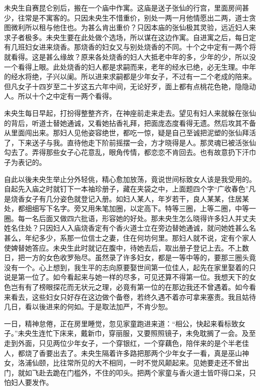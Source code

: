 \documentclass[a4paper,12pt,UTF8,twoside]{ctexbook}
\begin{document}
未央生自赛昆仑别后，搬在一个庙中作寓。这庙是送子张仙的行宫，里面房间甚少，往常是不寓客的。只因未央生不惜重价，别处一两一月他情愿出二两，道士贪图微利所以租与他住也。为甚么肯出重价？只因本庙的张仙极其灵验，远近妇人来求子者极多。未央生要在此处做个选场，所以谋在这边作寓。自进寓之后，每日定有几班妇女进来烧香。那烧香的妇女又与别处烧香的不同。十个之中定有一两个将就看得。这是甚么缘故？原来各处烧香的妇人大抵老中年的多，少年的少，所以没一个看得上眼。此处烧香的妇人都是求嗣而来，老年的经水已绝，必无生理。中年的经水将绝，子兴以阑。所以进来求嗣都是少年女子，不过有一二个老成的陪来。但凡女子十四岁至二十岁这五六年中间，无论好歹，面上都有点桃花色艳，隐隐动人。所以十个之中定有一两个看得。

未央生每日早起，打扮得整整齐齐，在神座前走来走去。望见有妇人来就躲在张仙的背后，听道士替她通诚，又看她拈香礼拜，把面庞态度看得无遗。然后攻其不备从里面闯出来。那妇人见他姿容绝世，都吃一惊，疑是自己至诚把泥塑的张仙拜活了，下来送子与我。直待他走下阶前摇摆一会，方才晓得是人。那灵魂已被活张仙勾去了。弄得那些女子心花意乱，眼角传情，都恋恋不肯回去。也有故意扔下汗巾子为表记的。

自此以後未央生举止分外轻佻，精心愈加放荡，竟说世间标致女人该是我受用的。自起先入庙之时就钉下一本袖珍册子，藏在夹袋之中，上面题四个字“广收春色”凡是烧香女子有几分姿色就登记入册。如妇人某人，年岁若干，良人某某，住居某处，都细细写下名字。旁又用朱笔加圈，以定高下。特等三圈，上等二圈，中等一圈。每一名后面又做四六批语，形容她的好处。那未央生怎么晓得许多妇人并丈夫姓名住处？只因妇人入庙烧香定有个香火道士立在旁边替她通诚，就问她姓甚么名甚么，年纪多少，系那一位信士之妻，住在何坊何里。那妇人就不说，定有个家人使婢替她答应。未央生此时就记在腹中，待她去后，取出册子登记上去。不上数日，把一方的女色收罗殆尽。虽然录了许多妇女，都是一等中等的，要那三圈头竟没有一个。心上想到，我生平的志向原要娶世间第一位佳人，起先在家里娶着的只说是第一位了。如今看起来与她一样的尽多，可见还算不得第一位。我想天下的女色岂有有了榜眼探花而无状元之理，必竟有第一位的在那边我还不曾遇着。如今看来看去，这些妇女只好存在这边做个备卷，若终久遇不着亦可拿来塞责。我且姑待几日，看以後进来的何如。于是取法加严，不肯少恕。

一日，精神怠倦，正在房里睡觉，忽见家童跑进来道：“相公，快起来看标致女子。”未央生连忙下床来，戴新巾，穿丽服，又要照照镜子，未免耽搁了一会。及至走到外面，只见两位少年女子，一个穿银红，一个穿藕色，陪伴来的是个半老佳人，都烧了香要出去了。未央生隔着许多路把那两个少年女子一看，真是巫山神女，洛浦仙颐，比往常所见的大不相同，一时不觉风颠起来。见她要走还不曾出门，就如飞赴去跪在门槛外，不住的叩头。把两个家童与香火道士皆吓得口呆，只怕妇人要发作。
\end{document}
